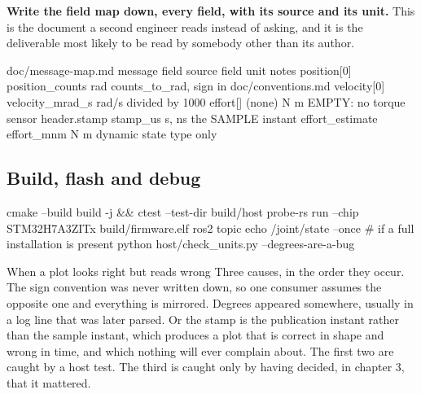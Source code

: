 \begin{steps}
\item \textbf{Write the field map down, every field, with its source and its
unit.} This is the document a second engineer reads instead of asking, and it is
the deliverable most likely to be read by somebody other than its author.
\begin{plaincode}
doc/message-map.md
  message field      source field          unit       notes
  position[0]        position_counts       rad        counts_to_rad, sign in
                                                      doc/conventions.md
  velocity[0]        velocity_mrad_s       rad/s      divided by 1000
  effort[]           (none)                N m        EMPTY: no torque sensor
  header.stamp       stamp_us              s, ns      the SAMPLE instant
  effort_estimate    effort_mnm            N m        dynamic state type only
\end{plaincode}
\end{steps}


\subsection*{Build, flash and debug}


\begin{shellcode}
cmake --build build -j && ctest --test-dir build/host
probe-rs run --chip STM32H7A3ZITx build/firmware.elf
ros2 topic echo /joint/state --once        # if a full installation is present
python host/check_units.py --degrees-are-a-bug
\end{shellcode}

\begin{note}{When a plot looks right but reads wrong}
Three causes, in the order they occur. The sign convention was never written
down, so one consumer assumes the opposite one and everything is mirrored.
Degrees appeared somewhere, usually in a log line that was later parsed. Or the
stamp is the publication instant rather than the sample instant, which produces
a plot that is correct in shape and wrong in time, and which nothing will ever
complain about. The first two are caught by a host test. The third is caught
only by having decided, in chapter 3, that it mattered.
\end{note}

